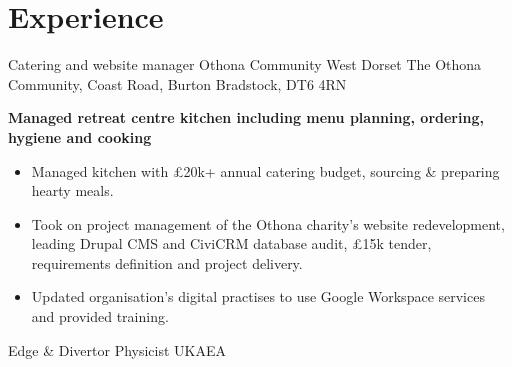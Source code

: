 \documentclass[12pt,a4paper,sans]{moderncv}        %
\begin{document}
\newpage

\section{Experience}
{\textcolor{mypurple}{Catering and website manager} } %
{Othona Community West Dorset} %
{\newline The Othona Community, Coast Road, Burton Bradstock, DT6 4RN}%
{}%
{\normalsize{\textbf{Managed retreat centre kitchen including menu planning, ordering, hygiene and cooking}}%
\begin{itemize}%
\item \textcolor{mypurple}{Managed} kitchen with £20k+ annual catering \textcolor{mypurple}{budget}, sourcing \& preparing hearty meals.
\item  Took on \textcolor{mypurple}{project management} of the Othona charity's website redevelopment, leading Drupal CMS and CiviCRM database audit, £15k tender, requirements definition and project delivery. 
\item Updated organisation's \textcolor{mypurple}{digital practises} to use Google Workspace services and provided training. 
\end{itemize}
}
{\textcolor{mypurple}{Edge \& Divertor Physicist}} %
{\small UKAEA} %
\end{document}
